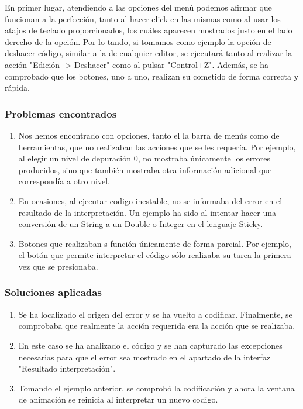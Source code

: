 \documentclass[a4paper, 12pt]{book}
\begin{document}
En primer lugar, atendiendo a las opciones del menú podemos afirmar que funcionan a la perfección, tanto al hacer click en las mismas como al
usar los atajos de teclado proporcionados, los cuáles aparecen mostrados justo en el lado derecho de la opción. Por lo tando, si tomamos como ejemplo la opción 
de deshacer código, similar a la de cualquier editor, se ejecutará tanto al realizar la acción "Edición -> Deshacer" como al pulsar "Control+Z".
Además, se ha comprobado que los botones, uno a uno, realizan su cometido de forma correcta y rápida.

\subsubsection*{Problemas encontrados}

\begin{enumerate}
  \item Nos hemos encontrado con opciones, tanto el la barra de menús como de herramientas, que no realizaban las acciones que se les requería.
	Por ejemplo, al elegir un nivel de depuración 0, no mostraba únicamente los errores producidos, sino que también mostraba otra información
	adicional que correspondía a otro nivel.
  \item En ocasiones, al ejecutar codigo inestable, no se informaba del error en el resultado de la interpretación. Un ejemplo ha sido al intentar
	hacer una conversión de un String a un Double o Integer en el lenguaje Sticky.
  \item Botones que realizaban s función únicamente de forma parcial. Por ejemplo, el botón que permite interpretar el código sólo realizaba su
	tarea la primera vez que se presionaba.
\end{enumerate}

\subsubsection*{Soluciones aplicadas}

\begin{enumerate}
  \item Se ha localizado el origen del error y se ha vuelto a codificar. Finalmente, se comprobaba que realmente la acción requerida era la acción
	que se realizaba.
  \item En este caso se ha analizado el código y se han capturado las excepciones necesarias para que el error sea mostrado en el apartado de la 
	interfaz "Resultado interpretación".
  \item Tomando el ejemplo anterior, se comprobó la codificación y ahora la ventana de animación se reinicia al interpretar un nuevo codigo.
\end{enumerate}
\end{document}
